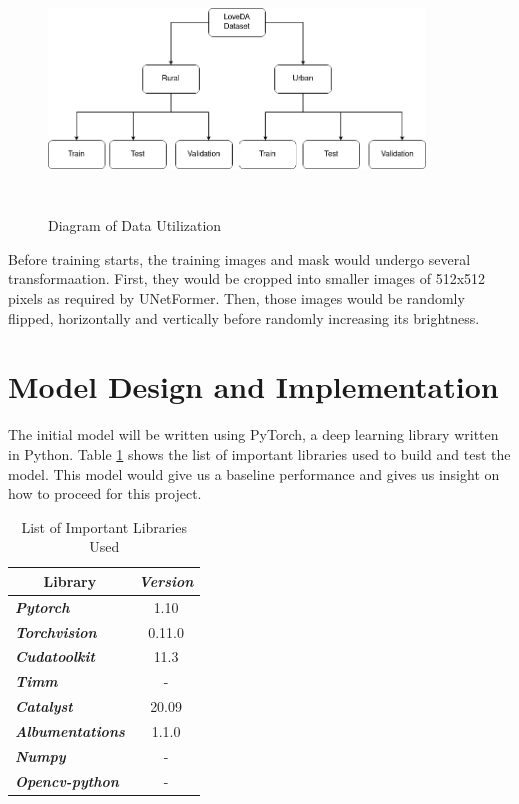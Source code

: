 \FloatBarrier
\begin{figure}[!h]
\includegraphics[width=10.0cm, height=6.5cm]{images/loveda-chart.png}
\centering
\caption{Diagram of Data Utilization}
\label{fig:data-uti}
\end{figure}
\FloatBarrier

Before training starts, the training images and mask would undergo several transformaation. First, they would be cropped into smaller images of 512x512 pixels as required by UNetFormer. Then, those images would be randomly flipped, horizontally and vertically before randomly increasing its brightness.



\section{Model Design and Implementation}

The initial model will be written using PyTorch, a deep learning library written in Python. Table \ref{tab:libraries} shows the list of important libraries used to build and test the model. This model would give us a baseline performance and gives us insight on how to proceed for this project.

\begin{table}[]
\centering
\begin{tabular}{|l|c|}
\hline
\multicolumn{1}{|c|}{\textbf{Library}} & \textit{\textbf{Version}} \\ \hline
\textit{\textbf{Pytorch}}              & 1.10                      \\ \hline
\textit{\textbf{Torchvision}}          & 0.11.0                    \\ \hline
\textit{\textbf{Cudatoolkit}}          & 11.3                      \\ \hline
\textit{\textbf{Timm}}                 & -                         \\ \hline
\textit{\textbf{Catalyst}}             & 20.09                     \\ \hline
\textit{\textbf{Albumentations}}       & 1.1.0                     \\ \hline
\textit{\textbf{Numpy}}                & -                         \\ \hline
\textit{\textbf{Opencv-python}}       & -                         \\ \hline
\end{tabular}
\caption{List of Important Libraries Used}
\label{tab:libraries}
\end{table}

